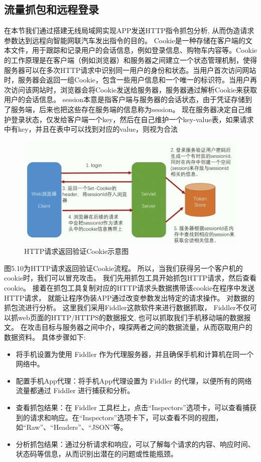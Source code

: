 \subsection{流量抓包和远程登录}
在本节我们通过搭建无线局域网实现APP发送HTTP指令抓包分析, 从而伪造请求参数达到远程向智能网联汽车发出指令的目的。
Cookie是一种存储在客户端的文本文件，用于跟踪和记录用户的会话信息，例如登录信息、购物车内容等。Cookie的工作原理是在客户端（例如浏览器）和服务器之间建立一个状态管理机制，使得服务器可以在多次HTTP请求中识别同一用户的身份和状态。当用户首次访问网站时，服务器会返回一组Cookie，包含一些用户信息和一个唯一的标识符。当用户再次访问该网站时，浏览器会将Cookie发送给服务器，服务器通过解析Cookie来获取用户的会话信息。
session本意是指客户端与服务器的会话状态，由于凭证存储到了服务端，后来也把这些存在服务端的信息称为session。
现在服务器决定自己维护登录状态，仅发给客户端一个key，然后在自己维护一个key-value表，如果请求中有key，并且在表中可以找到对应的value，则视为合法
\begin{figure}
  \centering
  \includegraphics[scale=0.5]{resources/img/i25.png}
  \caption{HTTP请求返回验证Cookie示意图}
\end{figure} 
图5.10为HTTP请求返回验证Cookie流程。
所以，当我们获得另一个客户机的 cookie时，我们可以冒充攻击。
我们先用抓包工具开始抓包HTTP请求，然后查看cookie。
接着在抓包工具复制对应的HTTP请求头数据携带该cookie在程序中发送HTTP请求，
就能让程序伪装APP通过改变参数发出特定的请求操作。
\newline
对数据的抓包流进行分析。
这里我们采用Fiddler\cite{crane2015fiddler}这款软件来进行数据抓取， Fiddler不仅可以抓web页面的HTTP/HTTPS的数据报文, 也可以抓取我们手机移动端的数据报文。
在攻击目标与服务器之间中介，嗅探两者之间的数据流量，从而窃取用户的数据资料。
具体步骤如下:
\begin{itemize}
    \item 将手机设置为使用 Fiddler 作为代理服务器，并且确保手机和计算机在同一个网络中。
    \item 配置手机App代理：将手机App代理设置为 Fiddler 的代理，以便所有的网络流量都通过 Fiddler 进行捕获和分析。
    \item 查看抓包结果：在 Fiddler 工具栏上，点击“Inspectors”选项卡，可以查看捕获到的请求和响应。在“Inspectors”选项卡下，可以查看不同的视图，如“Raw”、“Headers”、“JSON”等。
    \item 分析抓包结果：通过分析请求和响应，可以了解每个请求的内容、响应时间、状态码等信息，从而识别出潜在的问题或性能瓶颈。
\end{itemize}

